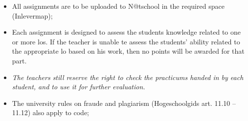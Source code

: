 \begin{itemize}
  \item All assignments are to be uploaded to N@tschool in the required space (Inlevermap);
  \item Each assignment is designed to assess the students knowledge related to one or more \glspl{lo}.
          If the teacher is unable te assess the students' ability related to the appropriate \gls{lo} based on his work, then no points will be awarded for that part.
  \item \textit{The teachers still reserve the right to check the practicums handed in by each student, and to use it for further evaluation.}
  \item The university rules on fraude and plagiarism (Hogeschoolgids art. 11.10 -- 11.12) also apply to code;
\end{itemize}
